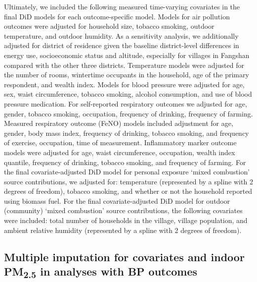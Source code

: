 \documentclass[
  letterpaper,
  DIV=11,
  numbers=noendperiod]{scrartcl}
\begin{document}
Ultimately, we included the following measured time-varying covariates
in the final DiD models for each outcome-specific model. Models for air
pollution outcomes were adjusted for household size, tobacco smoking,
outdoor temperature, and outdoor humidity. As a sensitivity analysis, we
additionally adjusted for district of residence given the baseline
district-level differences in energy use, socioeconomic status and
altitude, especially for villages in Fangshan compared with the other
three districts. Temperature models were adjusted for the number of
rooms, wintertime occupants in the household, age of the primary
respondent, and wealth index. Models for blood pressure were adjusted
for age, sex, waist circumference, tobacco smoking, alcohol consumption,
and use of blood pressure medication. For self-reported respiratory
outcomes we adjusted for age, gender, tobacco smoking, occupation,
frequency of drinking, frequency of farming. Measured respiratory
outcome (FeNO) models included adjustment for age, gender, body mass
index, frequency of drinking, tobacco smoking, and frequency of
exercise, occupation, time of measurement. Inflammatory marker outcome
models were adjusted for age, waist circumference, occupation, wealth
index quantile, frequency of drinking, tobacco smoking, and frequency of
farming. For the final covariate-adjusted DiD model for personal
exposure `mixed combustion' source contributions, we adjusted for:
temperature (represented by a spline with 2 degrees of freedom), tobacco
smoking, and whether or not the household reported using biomass fuel.
For the final covariate-adjusted DiD model for outdoor (community)
`mixed combustion' source contributions, the following covariates were
included: total number of households in the village, village population,
and ambient relative humidity (represented by a spline with 2 degrees of
freedom).

\subsection{\texorpdfstring{Multiple imputation for covariates and
indoor PM\textsubscript{2.5} in analyses with BP
outcomes}{Multiple imputation for covariates and indoor PM2.5 in analyses with BP outcomes}}\label{multiple-imputation-for-covariates-and-indoor-pm2.5-in-analyses-with-bp-outcomes}
\end{document}

